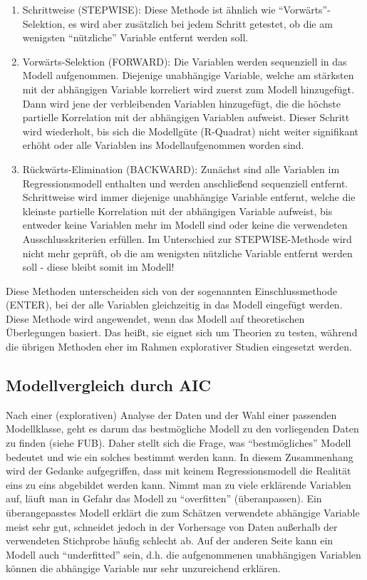 \documentclass[]{article}
\providecommand{\tightlist}{%
  \setlength{\itemsep}{0pt}\setlength{\parskip}{0pt}}
\begin{document}
\begin{enumerate}
\def\labelenumi{\arabic{enumi}.}
\tightlist
\item
  Schrittweise (STEPWISE): Diese Methode ist ähnlich wie ``Vorwärts''-Selektion, es wird aber zusätzlich bei jedem Schritt getestet, ob die am wenigsten ``nützliche'' Variable entfernt werden soll.
\item
  Vorwärts-Selektion (FORWARD): Die Variablen werden sequenziell in das Modell aufgenommen. Diejenige unabhängige Variable, welche am stärksten mit der abhängigen Variable korreliert wird zuerst zum Modell hinzugefügt. Dann wird jene der verbleibenden Variablen hinzugefügt, die die höchste partielle Korrelation mit der abhängigen Variablen aufweist. Dieser Schritt wird wiederholt, bis sich die Modellgüte (R-Quadrat) nicht weiter signifikant erhöht oder alle Variablen ins Modellaufgenommen worden sind.
\item
  Rückwärts-Elimination (BACKWARD): Zunächst sind alle Variablen im Regressionsmodell enthalten und werden anschließend sequenziell entfernt. Schrittweise wird immer diejenige unabhängige Variable entfernt, welche die kleinste partielle Korrelation mit der abhängigen Variable aufweist, bis entweder keine Variablen mehr im Modell sind oder keine die verwendeten Ausschlusskriterien erfüllen. Im Unterschied zur STEPWISE-Methode wird nicht mehr geprüft, ob die am wenigsten nützliche Variable entfernt werden soll - diese bleibt somit im Modell!
\end{enumerate}

Diese Methoden unterscheiden sich von der sogenannten Einschlussmethode (ENTER), bei der alle Variablen gleichzeitig in das Modell eingefügt werden. Diese Methode wird angewendet, wenn das Modell auf theoretischen Überlegungen basiert. Das heißt, sie eignet sich um Theorien zu testen, während die übrigen Methoden eher im Rahmen explorativer Studien eingesetzt werden.

\hypertarget{modellvergleich-durch-aic}{%
\subsection*{Modellvergleich durch AIC}\label{modellvergleich-durch-aic}}

Nach einer (explorativen) Analyse der Daten und der Wahl einer passenden Modellklasse, geht es darum das bestmögliche Modell zu den vorliegenden Daten zu finden (siehe FUB). Daher stellt sich die Frage, was ``bestmögliches'' Modell bedeutet und wie ein solches bestimmt werden kann. In diesem Zusammenhang wird der Gedanke aufgegriffen, dass mit keinem Regressionsmodell die Realität eins zu eins abgebildet werden kann. Nimmt man zu viele erklärende Variablen auf, läuft man in Gefahr das Modell zu ``overfitten'' (überanpassen). Ein überangepasstes Modell erklärt die zum Schätzen verwendete abhängige Variable meist sehr gut, schneidet jedoch in der Vorhersage von Daten außerhalb der verwendeten Stichprobe häufig schlecht ab. Auf der anderen Seite kann ein Modell auch ``underfitted'' sein, d.h. die aufgenommenen unabhängigen Variablen können die abhängige Variable nur sehr unzureichend erklären.
\end{document}
